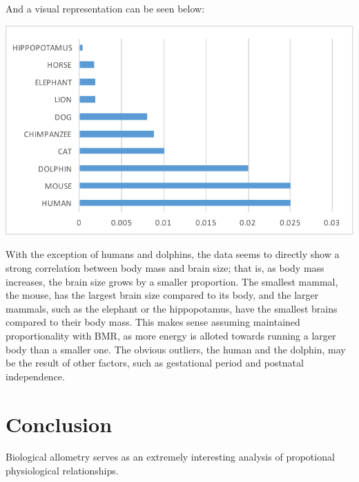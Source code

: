 \documentclass[10pt,letterpaper]{article}
\begin{document}
			And a visual representation can be seen below:
			\newline \newline
			\centerline{\includegraphics{Picture10.pdf}}
			\newline \newline
			With the exception of humans and dolphins, the data seems to directly show a strong correlation between body mass and brain size; that is, as body mass increases, the brain size grows by a smaller proportion. The smallest mammal, the mouse, has the largest brain size compared to its body, and the larger mammals, such as the elephant or the hippopotamus, have the smallest brains compared to their body mass. This makes sense assuming maintained proportionality with BMR, as more energy is alloted towards running a larger body than a smaller one. The obvious outliers, the human and the dolphin, may be the result of other factors, such as gestational period and postnatal independence. 
	\section{Conclusion}
		Biological allometry serves as an extremely interesting analysis of propotional physiological relationships. 
\end{document}
